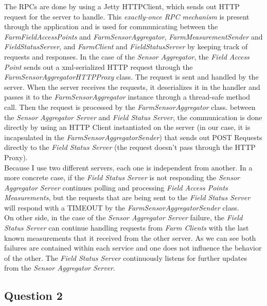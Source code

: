 \documentclass{article}      %
\begin{document}
The RPCs are done by using a Jetty HTTPClient, which sends out HTTP request for the server to handle. This \emph{exactly-once RPC mechanism} is present through the application and is used for communicating between the \emph{FarmFieldAccessPoints} and \emph{FarmSensorAggregator}, \emph{FarmMeasurementSender} and \emph{FieldStatusServer}, and \emph{FarmClient} and \emph{FieldStatusServer} by keeping track of requests and responses. In the case of the \emph{Sensor Aggregator}, the \emph{Field Access Point} sends out a xml-serialized HTTP request through the \emph{FarmSensorAggregatorHTTPProxy} class. The request is sent and handled by the server. When the server receives the requests, it deserializes it in the handler and passes it to the \emph{FarmSensorAggregator} instance through a thread-safe method call. Then the request is processed by the \emph{FarmSensorAggregator} class. between the \emph{Sensor Aggregator Server} and \emph{Field Status Server}, the communication is done directly by using an HTTP Client instantiated on the server (in our case, it is incapsulated in the \emph{FarmSensorAggregatorSender}) that sends out POST Requests directly to the \emph{Field Status Server} (the request doesn't pass through the HTTP Proxy).\\

Because I use two different servers, each one is independent from another. In a more concrete case, if the \emph{Field Status Server} is not responding the \emph{Sensor Aggregator Server} continues polling and processing \emph{Field Access Points Measurements}, but the requests that are being sent to the \emph{Field Status Server} will respond with a TIMEOUT by the \emph{FarmSensorAggregatorSender} class.\\

On other side, in the case of the \emph{Sensor Aggregator Server} failure, the \emph{Field Status Server} can continue handling requests from \emph{Farm Clients} with the last known measurements that it received from the other server. As we can see both failures are contained within each service and one does not influence the behavior of the other. The \emph{Field Status Server} continuously listens for further updates from the \emph{Sensor Aggregator Server}.\\

\subsection* {Question 2}
\end{document}

